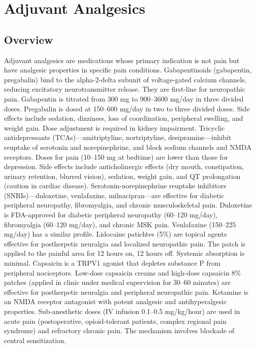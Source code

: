 \chapter{Adjuvant Analgesics}
\label{sec:Adjuvant Analgesics}

\section{Overview}
Adjuvant analgesics are medications whose primary indication is not pain but have analgesic properties in specific pain conditions. Gabapentinoids (gabapentin, pregabalin) bind to the alpha-2-delta subunit of voltage-gated calcium channels, reducing excitatory neurotransmitter release. They are first-line for neuropathic pain. Gabapentin is titrated from 300 mg to 900--3600 mg/day in three divided doses. Pregabalin is dosed at 150--600 mg/day in two to three divided doses. Side effects include sedation, dizziness, loss of coordination, peripheral swelling, and weight gain. Dose adjustment is required in kidney impairment. Tricyclic antidepressants (TCAs)---amitriptyline, nortriptyline, desipramine---inhibit reuptake of serotonin and norepinephrine, and block sodium channels and NMDA receptors. Doses for pain (10--150 mg at bedtime) are lower than those for depression. Side effects include anticholinergic effects (dry mouth, constipation, urinary retention, blurred vision), sedation, weight gain, and QT prolongation (caution in cardiac disease). Serotonin-norepinephrine reuptake inhibitors (SNRIs)---duloxetine, venlafaxine, milnacipran---are effective for diabetic peripheral neuropathy, fibromyalgia, and chronic musculoskeletal pain. Duloxetine is FDA-approved for diabetic peripheral neuropathy (60--120 mg/day), fibromyalgia (60--120 mg/day), and chronic MSK pain. Venlafaxine (150--225 mg/day) has a similar profile. Lidocaine patichtes (5\%) are topical agents effective for postherpetic neuralgia and localized neuropathic pain. The patch is applied to the painful area for 12 hours on, 12 hours off. Systemic absorption is minimal. Capsaicin is a TRPV1 agonist that depletes substance P from peripheral nociceptors. Low-dose capsaicin creams and high-dose capsaicin 8\% patches (applied in clinic under medical supervision for 30--60 minutes) are effective for postherpetic neuralgia and peripheral neuropathic pain. Ketamine is an NMDA receptor antagonist with potent analgesic and antihyperalgesic properties. Sub-anesthetic doses (IV infusion 0.1--0.5 mg/kg/hour) are used in acute pain (postoperative, opioid-tolerant patients, complex regional pain syndrome) and refractory chronic pain. The mechanism involves blockade of central sensitization.
